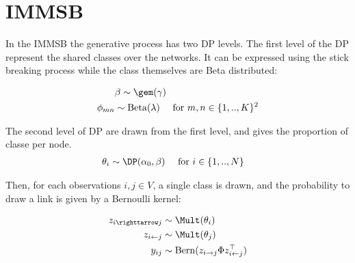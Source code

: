 
\section{IMMSB}

In the IMMSB the generative process has two DP levels. The first level of the DP represent the shared classes over the networks. It can be expressed using the stick breaking process while the class themselves are Beta distributed:

\begin{align}
    &\mathbf{\beta} \sim \gem(\gamma)  \\
    \phi_{mn} &\sim \mathrm{Beta}(\lambda) \quad\text{ for }  m,n \in \{1, .., K\}^2
\end{align}

The second level of DP are drawn from the first level, and gives the proportion of classe per node.
\begin{align}
    \theta_i &\sim \DP(\alpha_0, \beta) \quad\text{ for }  i \in \{1, .., N\}
\end{align}

Then, for each observations $i, j \in V$, a single class is drawn, and the probability to draw a link is given by a Bernoulli kernel:

\begin{align}
    z_{i\righttarrow j} &\sim \Mult(\theta_i) \\
    z_{i\leftarrow j} &\sim \Mult(\theta_j) \\
    y_{ij} &\sim \mathrm{Bern}(z_{i\rightarrow j} \Phi z_{i\leftarrow j}^\top)
\end{align}

